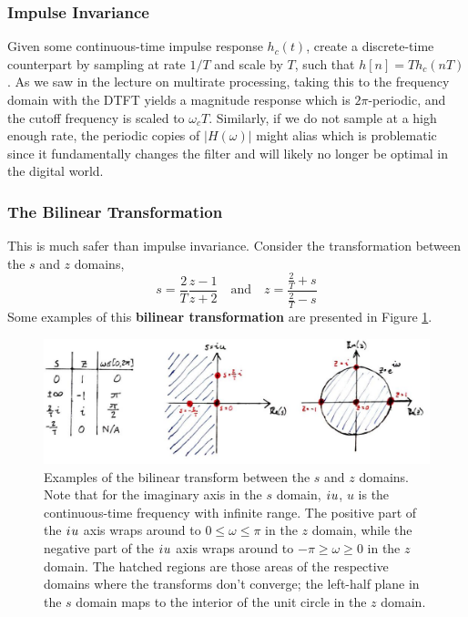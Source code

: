 \subsubsection{Impulse Invariance}
%
Given some continuous-time impulse response $h_c(t)$, create a discrete-time
counterpart by sampling at rate $1/T$ and scale by $T$, such that
$h[n] = Th_c(nT)$. As we saw in the lecture on multirate processing, taking
this to the frequency domain with the DTFT yields a magnitude response which
is $2\pi$-periodic, and the cutoff frequency is scaled to $\omega_c T$.
Similarly, if we do not sample at a high enough rate, the periodic copies of
$|H(\omega)|$ might alias which is problematic since it fundamentally changes
the filter and will likely no longer be optimal in the digital world.

\subsubsection{The Bilinear Transformation}
%
This is much safer than impulse invariance. Consider the transformation
between the $s$ and $z$ domains,
%
\begin{displaymath}
  s = \frac{2}{T}\frac{z-1}{z+2} \quad\mathrm{and}\quad
  z = \frac{\frac{2}{T} + s}{\frac{2}{T} - s}
\end{displaymath}
%
Some examples of this \textbf{bilinear transformation} are presented in
Figure \ref{fig::lecture_18_bilinear_transform}.
%
\begin{figure}[H]
  \includegraphics[width=\textwidth]{images/lecture_18_bilinear_transform.JPG}
  \caption{Examples of the bilinear transform between the $s$ and
    $z$ domains. Note that for the imaginary axis in the $s$ domain,
    ${i\mkern1mu} u$, $u$ is the continuous-time frequency with infinite range.
    The positive part of the ${i\mkern1mu} u$ axis wraps around to
    $0 \leq \omega \leq \pi$ in the $z$ domain, while the negative
    part of the ${i\mkern1mu} u$ axis wraps around to $-\pi \geq \omega \geq 0$
    in the $z$ domain. The hatched regions are those areas of the respective
    domains where the transforms don't converge; the left-half plane in
    the $s$ domain maps to the interior of the unit circle in the $z$ domain.
  }
  \label{fig::lecture_18_bilinear_transform}
\end{figure}
